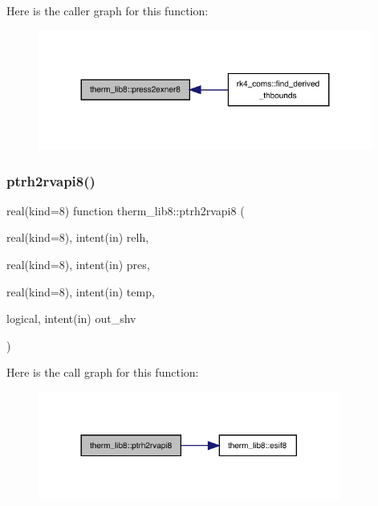 Here is the caller graph for this function\+:
\nopagebreak
\begin{figure}[H]
\begin{center}
\leavevmode
\includegraphics[width=311pt]{namespacetherm__lib8_affcedde7d4e3f1d858091ea47c58186f_icgraph}
\end{center}
\end{figure}
\mbox{\label{namespacetherm__lib8_a7cf8c625372462c063600af8050c6639}} 
\subsubsection{\texorpdfstring{ptrh2rvapi8()}{ptrh2rvapi8()}}
{\footnotesize\ttfamily real(kind=8) function therm\+\_\+lib8\+::ptrh2rvapi8 (\begin{DoxyParamCaption}\item[{real(kind=8), intent(in)}]{relh,  }\item[{real(kind=8), intent(in)}]{pres,  }\item[{real(kind=8), intent(in)}]{temp,  }\item[{logical, intent(in)}]{out\+\_\+shv }\end{DoxyParamCaption})}

Here is the call graph for this function\+:
\nopagebreak
\begin{figure}[H]
\begin{center}
\leavevmode
\includegraphics[width=281pt]{namespacetherm__lib8_a7cf8c625372462c063600af8050c6639_cgraph}
\end{center}
\end{figure}
\mbox{\label{namespacetherm__lib8_a8ad59ba9abc05562f0c90d7ef6a8bca8}} 
